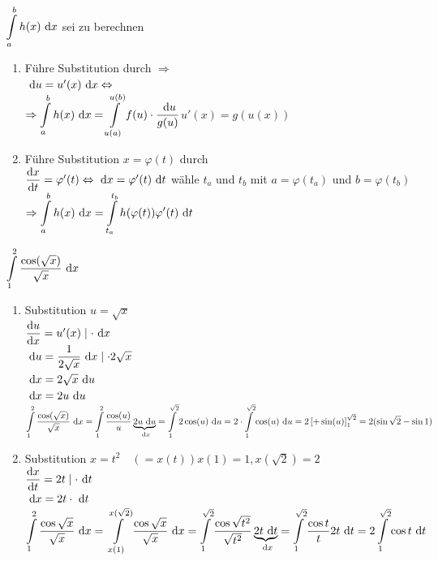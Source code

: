 \Bem $\displaystyle\int\limits_{a}^{b}h(x)\ \mathrm{d}x$ sei zu berechnen
\begin{enumerate}
	\item Führe Substitution  durch $\Rightarrow$ \\
	$\ \mathrm{d}u=u'(x)\ \mathrm{d}x\Leftrightarrow$\\
	$\Rightarrow\displaystyle\int\limits_{a}^{b}h(x)\ \mathrm{d}x=\displaystyle\int\limits_{u(a)}^{u(b)}f(u)\cdot\dfrac{\ \mathrm{d}u}{g(u)}$\qquad$u'(x)=g(u(x))$
	
	\item Führe Substitution $x=\varphi(t)$ durch\\
	$\dfrac{\mathrm{d}x}{\mathrm{d}t}=\varphi'(t)\Leftrightarrow\ \mathrm{d}x=\varphi'(t)\ \mathrm{d}t$ wähle $t_a$ und $t_b$ mit $a=\varphi(t_a)$ und $b=\varphi(t_b)$\\
	$\Rightarrow\displaystyle\int\limits_{a}^{b}h(x)\ \mathrm{d}x=\displaystyle\int\limits_{t_a}^{t_b}h(\varphi(t))\varphi'(t)\ \mathrm{d}t$
\end{enumerate}

\Bsp $\displaystyle\int\limits_{1}^{2}\dfrac{\cos(\sqrt{x})}{\sqrt{x}}\ \mathrm{d}x$

\begin{enumerate}
	\item Substitution $u=\sqrt{x}$\\
	$\dfrac{\mathrm{d}u}{\mathrm{d}x}=u'(x)\mid\cdot\ \mathrm{d}x$\\
	$\ \mathrm{d}u=\dfrac{1}{2\sqrt{x}}\ \mathrm{d}x\mid\cdot2\sqrt{x}$\\
	$\ \mathrm{d}x=2\sqrt{x}\ \mathrm{d}u$\\
	$\ \mathrm{d}x=2u\ \mathrm{d}u$\\
	$\displaystyle\int\limits_{1}^{2}\dfrac{\cos(\sqrt{x})}{\sqrt{x}}\ \mathrm{d}x=\displaystyle\int\limits_{1}^{2}\dfrac{\cos(u)}{u}\underbrace{2u\ \mathrm{d}u}_{\ \mathrm{d}x}=\displaystyle\int\limits_{1}^{\sqrt{2}}2\cos(u)\ \mathrm{d}u=2\cdot\displaystyle\int\limits_{1}^{\sqrt{2}}\cos(u)\ \mathrm{d}u=2\left[+\sin(u)\right]_1^{\sqrt{2}}=2(\sin\sqrt{2}-\sin1)$
	
	\item Substitution $x=t^2\quad(=x(t))$\qquad $x(1)=1,x(\sqrt{2})=2$\\
	$\dfrac{\mathrm{d}x}{\mathrm{d}t}=2t\mid\cdot\ \mathrm{d}t$\\
	$\ \mathrm{d}x=2t\cdot\ \mathrm{d}t$\\
	$\displaystyle\int\limits_{1}^{2}\dfrac{\cos\sqrt{x}}{\sqrt{x}}\ \mathrm{d}x=\displaystyle\int\limits_{x(1)}^{x(\sqrt{2})}\dfrac{\cos\sqrt{x}}{\sqrt{x}}\ \mathrm{d}x=\displaystyle\int\limits_{1}^{\sqrt{2}}\dfrac{\cos\sqrt{t^2}}{\sqrt{t^2}}\underbrace{2t\ \mathrm{d}t}_{\ \mathrm{d}x}=\displaystyle\int\limits_{1}^{\sqrt{2}}\dfrac{\cos t}{t}2t\ \mathrm{d}t=2\int\limits_{1}^{\sqrt{2}}\cos t\ \mathrm{d}t$
\end{enumerate}

